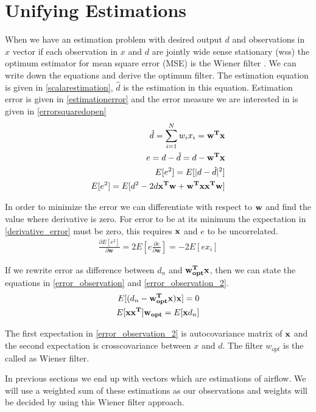 \section{Unifying Estimations}
When we have an estimation problem with desired output $d$ and
observations in $x$ vector if each observation in $x$ and $d$ are
jointly wide sense stationary (wss) the optimum estimator for mean
square error (MSE) is the Wiener filter \cite{adaptive-filter-theory}. We can write down the
equations and derive the optimum filter. The estimation equation is
given in \eqref{scalarestimation}, $\hat{d}$ is the estimation in this
equation. Estimation error is given in \eqref{estimationerror} and the
error measure we are interested in is given in
\eqref{errorsquaredopen}
\begin{align}
\hat{d} = \sum_{i=1}^{N}w_ix_i = \bold{w^Tx} \label{scalarestimation} \\
e = d - \hat{d} = d - \bold{w^Tx} \label{estimationerror} \\
E[e^2] = E[|d - \hat{d}|^2] \label{errorsquared} \\
E[e^2] = E[d^2 - 2d\bold{x^T w} + \bold{w^T x x^T w}]
\label{errorsquaredopen}
\end{align} \par
In order to minimize the error we can differentiate with respect to
$\bold{w}$ and find the value where derivative is zero. For error to
be at its minimum the expectation in \eqref{derivative_error} must be
zero, this requires $\bold{x}$ and $e$ to be uncorrelated.
\begin{align}
\frac{\partial E[e^2]}{\partial \boldsymbol{w}} =
2E[e\frac{\partial e}{\partial \boldsymbol{w}}] = -2E[e x_i]
\label{derivative_error}
\end{align} \par
If we rewrite error as difference between $d_n$ and
$\bold{w_{opt}^Tx}$, then we can state the equations in
\eqref{error_observation} and \eqref{error_observation_2}.
\begin{align}
E[(d_n - \bold{w_{opt}^Tx})\bold{x}] = 0 \label{error_observation}\\
E[\bold{xx^T}]\bold{w_{opt}} = E[\bold{x}d_n] \label{error_observation_2}
\end{align} \par
The first expectation in \eqref{error_observation_2} is autocovariance
matrix of $\bold{x}$ and the second expectation is crosscovariance
between $x$ and $d$. The filter $w_{opt}$ is the called as Wiener
filter. \par
In previous sections we end up with vectors which are estimations of
airflow. We will use a weighted sum of these estimations as our
observations and weights will be decided by using this Wiener filter
approach.

